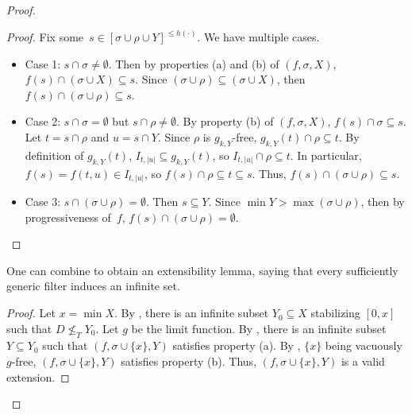 \documentclass[10pt,a4paper]{article}
\newcommand{\uh}{\upharpoonright}
\newcommand{\NN}[0]{\mathbb{N}}
\numberwithin{theorem}{section}
\newtheorem{lemma}[theorem]{Lemma}
\begin{document}
\begin{proof}
\begin{proof}
Fix some~$s \in [\sigma \cup \rho \cup Y]^{\leq h(\cdot)}$. We have multiple cases.
\begin{itemize}
    \item Case 1: $s \cap \sigma \neq \emptyset$. Then by properties (a) and (b) of $(f, \sigma, X)$, $f(s) \cap (\sigma \cup X) \subseteq s$. Since $(\sigma \cup \rho) \subseteq (\sigma \cup X)$, then $f(s) \cap (\sigma \cup \rho) \subseteq s$.
    \item Case 2: $s \cap \sigma = \emptyset$ but $s \cap \rho \neq \emptyset$. By property (b) of $(f, \sigma, X)$, $f(s) \cap \sigma \subseteq s$. Let $t = s \cap \rho$ and $u = s \cap Y$. Since $\rho$ is $g_{k,Y}$-free, $g_{k,Y}(t) \cap \rho \subseteq t$. By definition of $g_{k,Y}(t)$, $I_{t, |u|} \subseteq g_{k,Y}(t)$, so $I_{t, |u|} \cap \rho \subseteq t$. In particular, $f(s) = f(t, u) \in I_{t, |u|}$, so $f(s) \cap \rho \subseteq t \subseteq s$. Thus, $f(s) \cap (\sigma \cup \rho) \subseteq s$.
    \item Case 3: $s \cap (\sigma \cup \rho) = \emptyset$. Then $s \subseteq Y$. Since $\min Y > \max (\sigma \cup \rho)$, then by progressiveness of~$f$, $f(s) \cap (\sigma \cup \rho) = \emptyset$.
\end{itemize}
\end{proof}

One can combine  to obtain an extensibility lemma, saying that every sufficiently generic filter induces an infinite set. 

\begin{proof}
Let $x = \min X$. By , there is an infinite subset $Y_0 \subseteq X$ stabilizing $[0, x]$ such that $D \not \leq_T Y_0$. Let $g$ be the limit function. By , there is an infinite subset $Y \subseteq Y_0$ such that $(f, \sigma \cup \{x\}, Y)$ satisfies property (a).
By , $\{x\}$ being vacuously $g$-free, $(f, \sigma \cup \{x\}, Y)$ satisfies property (b). Thus, $(f, \sigma \cup \{x\}, Y)$ is a valid extension.
\end{proof}


\end{proof}
\end{document}

